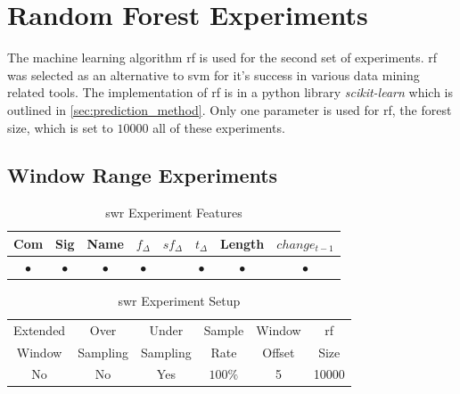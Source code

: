 \section{Random Forest Experiments}
\label{sec:rf_experiments}

The machine learning algorithm \gls{rf} is used for the second set of experiments. \gls{rf} was selected as an alternative to \gls{svm} for it's success in various data mining related tools. The implementation of \gls{rf} is in a python library \textit{scikit-learn} which is outlined in \autoref{sec:prediction_method}. Only one parameter is used for \gls{rf}, the forest size, which is set to $10000$ all of these experiments.

\subsection{Window Range Experiments}
\label{sec:rf_swr_experiment}

\begin{table}[h]
\begin{center}

    \begin{tabular}{|c|c|c|c|c|c|c|c|}
        \hline
        Com & Sig & Name & $f_{\Delta}$ & $sf_{\Delta}$ & $t_\Delta$ & Length & $change_{t-1}$ \\
         \hline
        $\bullet$ & $\bullet$ & $\bullet$ & $\bullet$ & & $\bullet$ & $\bullet$ & $\bullet$ \\ \hline
    \end{tabular}
    \caption{\gls{swr} Experiment Features}
    \label{tab:rf_window_range_experiment_features}
\end{center}

\end{table}

\begin{table}[h]
\begin{center}

    \begin{tabular}{|c|c|c|c|c|c|}
        \hline
        Extended & Over & Under & Sample & Window & \gls{rf} \\
        Window & Sampling & Sampling & Rate & Offset & Size \\ \hline
        No & No & Yes & $100\%$ & 5 & 10000 \\ \hline
    \end{tabular}
    \caption{\gls{swr} Experiment Setup}
    \label{tab:rf_window_range_experiment_setup}
\end{center}

\end{table}

